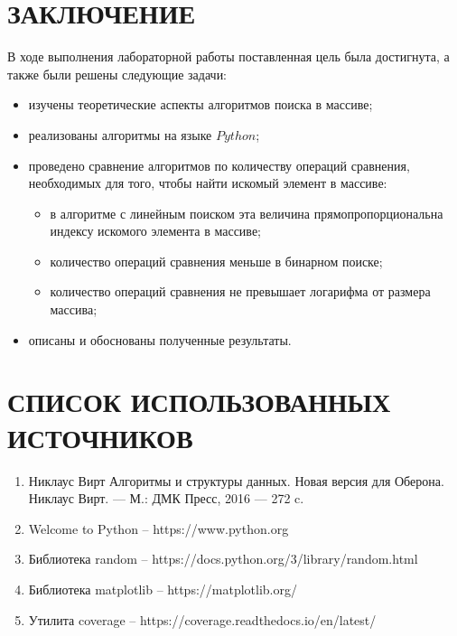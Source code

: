 \documentclass{article}
\begin{document}
\clearpage\section*{ЗАКЛЮЧЕНИЕ}
В ходе выполнения лабораторной работы поставленная цель была достигнута, а также были решены следующие задачи:
\begin{itemize}
	\item изучены теоретические аспекты алгоритмов поиска в массиве;
	\item реализованы алгоритмы на языке $Python$; 
	\item проведено сравнение алгоритмов по количеству операций сравнения, необходимых для того, чтобы найти
	искомый элемент в массиве:
	\begin{itemize}
		\item в алгоритме с линейным поиском эта величина прямопропорциональна индексу искомого элемента в массиве;
		\item количество операций сравнения меньше в бинарном поиске;
		\item количество операций сравнения не превышает логарифма от размера массива;
	\end{itemize}
	\item описаны и обоснованы полученные результаты.
\end{itemize} 

\clearpage\section*{СПИСОК ИСПОЛЬЗОВАННЫХ ИСТОЧНИКОВ}
\begin{enumerate}
	\item Никлаус Вирт Алгоритмы и структуры данных. Новая версия для Оберона. Никлаус Вирт. — М.: ДМК Пресс, 2016 — 272 c.
	\item Welcome to Python -- https://www.python.org
	\item	Библиотека random -- https://docs.python.org/3/library/random.html
	\item	Библиотека matplotlib -- https://matplotlib.org/
	\item Утилита coverage -- https://coverage.readthedocs.io/en/latest/
\end{enumerate}
\end{document}
